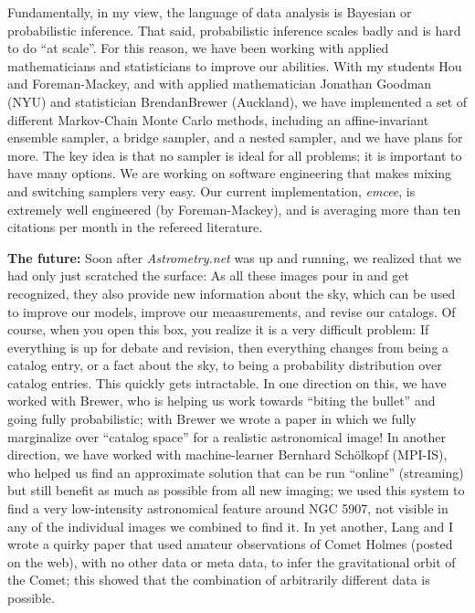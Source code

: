 \documentclass[11pt, letterpaper]{article}
\begin{document}
Fundamentally, in my view, the language of data analysis is Bayesian or probabilistic inference.
That said, probabilistic inference scales badly and is hard to do ``at scale''.
For this reason, we have been working with applied mathematicians and statisticians to improve our abilities.
With my students Hou and Foreman-Mackey, and with applied mathematician Jonathan Goodman (NYU) and statistician BrendanBrewer (Auckland),
  we have implemented a set of different Markov-Chain Monte Carlo methods,
  including an affine-invariant ensemble sampler, a bridge sampler, and a nested sampler,
  and we have plans for more.
The key idea is that no sampler is ideal for all problems; it is important to have many options.
We are working on software engineering that makes mixing and switching samplers very easy.
Our current implementation, \textsl{emcee}, is extremely well engineered (by Foreman-Mackey),
  and is averaging more than ten citations per month in the refereed literature.

\noindent\textbf{The future:}
Soon after \textsl{Astrometry.net} was up and running,
  we realized that we had only just scratched the surface:
As all these images pour in and get recognized, they also provide new information about the sky,
  which can be used to improve our models, improve our meaasurements, and revise our catalogs.
Of course, when you open this box, you realize it is a very difficult problem:
  If everything is up for debate and revision, then everything changes from being a catalog entry,
  or a fact about the sky, to being a probability distribution over catalog entries.
This quickly gets intractable.
In one direction on this, we have worked with Brewer,
  who is helping us work towards ``biting the bullet'' and going fully probabilistic;
  with Brewer we wrote a paper in which we fully marginalize over ``catalog space'' for a realistic astronomical image!
In another direction, we have worked with machine-learner Bernhard Sch\"olkopf (MPI-IS),
  who helped us find an approximate solution that can be run ``online'' (streaming) but still benefit
  as much as possible from all new imaging;
  we used this system to find a very low-intensity astronomical feature around NGC 5907,
  not visible in any of the individual images we combined to find it.
In yet another, Lang and I wrote a quirky paper that used amateur observations of Comet Holmes (posted on the web),
  with no other data or meta data,
  to infer the gravitational orbit of the Comet;
  this showed that the combination of arbitrarily different data is possible.
\end{document}
